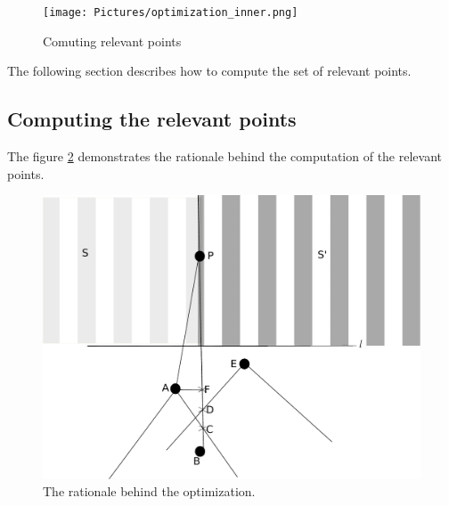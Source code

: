 \begin{figure}%
	\centering
    \texttt{[image: Pictures/optimization\_inner.png]}
    \caption[Optimization]{Comuting relevant points}
	\label{fig:opt_inner}
\end{figure}
The following section describes how to compute the set of relevant points.

\subsection{Computing the relevant points}
The figure \ref{fig:opt-rationale} demonstrates the rationale behind the computation of the relevant points.
\begin{figure}%
        \includegraphics{Figures/optimization-rationale.pdf}
    \caption[Optimization]{The rationale behind the optimization.}
	\label{fig:opt-rationale}
\end{figure}
